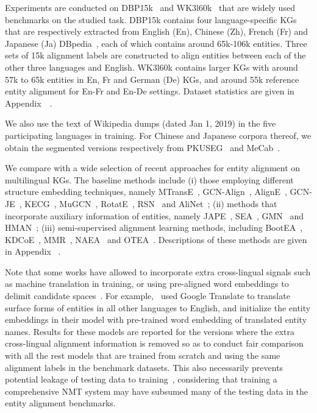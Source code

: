 \documentclass[11pt,a4paper]{article}
\newcommand{\stitle}[1]{\vspace{2ex} \noindent{\bf #1}}
\begin{document}
\stitle{Datasets.} Experiments are conducted on DBP15k~\cite{sun2017cross} and WK3l60k~\cite{chen2018co} that are widely used benchmarks on the studied task.
DBP15k contains four language-specific KGs that are respectively extracted from English (En), Chinese (Zh), French (Fr) and Japanese (Ja) DBpedia~\cite{lehmann2015dbpedia}, each of which contains around 65k-106k entities. 
Three sets of 15k alignment labels are constructed to align entities between each of the other three languages and English.
WK3l60k contains larger KGs with around 57k to 65k entities in En, Fr and German (De) KGs, and around 55k reference entity alignment for En-Fr and En-De settings.
Dataset statistics are given in Appendix~~\cite{chen2021cross}.

We also use the text of Wikipedia dumps (dated Jan 1, 2019) in the five participating languages in training.
For Chinese and Japanese corpora thereof, we obtain the segmented versions respectively from PKUSEG~\cite{pkuseg} and MeCab~\cite{kudo2006mecab}.




\stitle{Baseline methods.}
We compare with a wide selection of recent approaches for entity alignment on multilingual KGs.
The baseline methods include (i) those employing different structure embedding techniques, namely 
MTransE~\cite{chen2017multigraph},  GCN-Align~\cite{wang2018cross}, AlignE~\cite{sun2018bootstrapping}, 
GCN-JE~\cite{wu2019jointly},
KECG~\cite{li2019semi},
MuGCN~\cite{cao2019multi}, RotatE~\cite{sun2019rotate}, 
RSN~\cite{guo2019learning} and AliNet~\cite{sun2020alinet}; 
(ii) methods that incorporate auxiliary information of entities, namely JAPE~\cite{sun2017cross}, SEA~\cite{pei2019deg}, GMN~\cite{xu2019cross} and HMAN~\cite{yang2019aligning};
(iii) semi-supervised alignment learning methods, including BootEA~\cite{sun2018bootstrapping}, KDCoE~\cite{chen2018co}, MMR~\cite{shi2019modeling}, NAEA~\cite{zhu2019neighborhood} and OTEA~\cite{pei2019transport}.
Descriptions of these methods are given in Appendix ~\cite{chen2021cross}.


Note that some works have allowed to incorporate extra cross-lingual signals such as machine translation in training, or using pre-aligned word embeddings to delimit candidate spaces~\cite{wu2019relation,wu2019jointly,xu2019cross}. For example,~\citet{wu2019relation,wu2019jointly} used Google Translate to translate surface forms of entities in all other languages to English, and initialize the entity embeddings in their model with pre-trained word embedding of translated entity names. 
Results for these models are reported for the versions where the extra cross-lingual alignment information
is removed so as to conduct fair comparison with all the rest models that are trained from scratch and using the same alignment labels in the benchmark datasets.
This also necessarily prevents potential leakage of testing data to training~\cite{liu2020exploring}, considering that  training a comprehensive NMT system may have subsumed many of the testing data in the entity alignment benchmarks.
\end{document}

